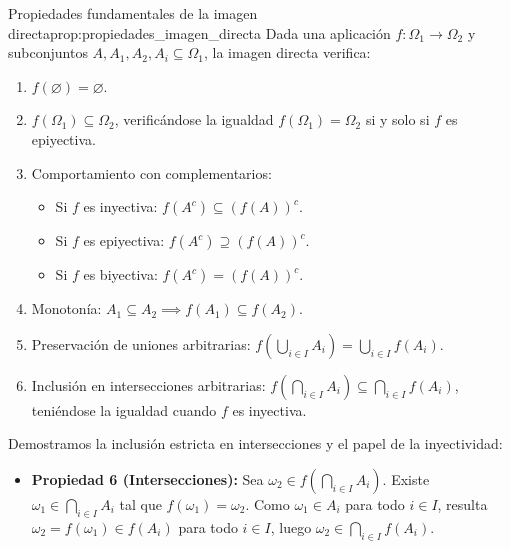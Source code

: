 \newpage
\begin{proposicion}{Propiedades fundamentales de la imagen directa}{prop:propiedades_imagen_directa}
Dada una aplicación $f: \Omega_1 \to \Omega_2$ y subconjuntos $A, A_1, A_2, A_i \subseteq \Omega_1$, la imagen directa verifica:
\begin{enumerate}[label=\arabic*)]
    \item $f(\varnothing) = \varnothing$.
    \item $f(\Omega_1) \subseteq \Omega_2$, verificándose la igualdad $f(\Omega_1) = \Omega_2$ si y solo si $f$ es epiyectiva.
    \item Comportamiento con complementarios:
    \begin{itemize}
        \item Si $f$ es inyectiva: $f(A^c) \subseteq (f(A))^c$.
        \item Si $f$ es epiyectiva: $f(A^c) \supseteq (f(A))^c$.
        \item Si $f$ es biyectiva: $f(A^c) = (f(A))^c$.
    \end{itemize}
    \item Monotonía: $A_1 \subseteq A_2 \implies f(A_1) \subseteq f(A_2)$.
    \item Preservación de uniones arbitrarias: $\displaystyle f\left( \bigcup_{i \in I} A_i \right) = \bigcup_{i \in I} f(A_i)$.
    \item Inclusión en intersecciones arbitrarias: $\displaystyle f\left( \bigcap_{i \in I} A_i \right) \subseteq \bigcap_{i \in I} f(A_i)$, teniéndose la igualdad cuando $f$ es inyectiva.
\end{enumerate}

\tcblower

\begin{demostracion}
Demostramos la inclusión estricta en intersecciones y el papel de la inyectividad:
\begin{itemize}
    \item \textbf{Propiedad 6 (Intersecciones):} Sea $\omega_2 \in f\left(\bigcap_{i \in I} A_i\right)$. Existe $\omega_1 \in \bigcap_{i \in I} A_i$ tal que $f(\omega_1) = \omega_2$. Como $\omega_1 \in A_i$ para todo $i \in I$, resulta $\omega_2 = f(\omega_1) \in f(A_i)$ para todo $i \in I$, luego $\omega_2 \in \bigcap_{i \in I} f(A_i)$.


\end{itemize}
\end{demostracion}
\end{proposicion}
